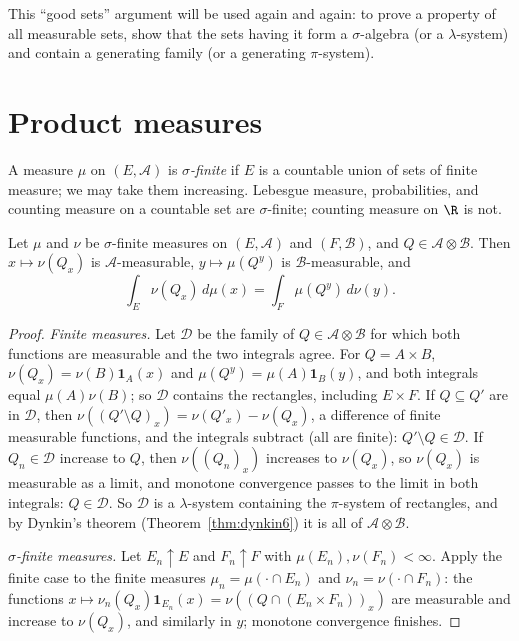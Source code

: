This ``good sets'' argument will be used again and again: to prove a property of all measurable sets, show that the sets having it form a
$\sigma$-algebra (or a $\lambda$-system) and contain a generating family (or a generating $\pi$-system).

\section{Product measures}

A measure $\mu$ on $(E,\mathcal A)$ is \emph{$\sigma$-finite} if $E$ is a countable union of sets of finite measure; we may take them increasing. Lebesgue measure, probabilities, and
counting measure on a countable set are $\sigma$-finite; counting measure on $\R$ is not.

\begin{lemma}\label{lem:slicemeasurable}
Let $\mu$ and $\nu$ be $\sigma$-finite measures on $(E,\mathcal A)$ and $(F,\mathcal B)$, and $Q\in\mathcal A\otimes\mathcal B$. Then $x\mapsto\nu(Q_x)$ is $\mathcal A$-measurable, $y\mapsto\mu(Q^y)$ is $\mathcal B$-measurable, and
\[\int_E\nu(Q_x)\,d\mu(x)=\int_F\mu(Q^y)\,d\nu(y).\]
\end{lemma}
\begin{proof}
\emph{Finite measures.} Let $\mathcal D$ be the family of $Q\in\mathcal A\otimes\mathcal B$ for which both functions are measurable and the two integrals agree. For $Q=A\times B$, $\nu(Q_x)=\nu(B)\mathbf 1_A(x)$
and $\mu(Q^y)=\mu(A)\mathbf 1_B(y)$, and both integrals equal $\mu(A)\nu(B)$; so $\mathcal D$ contains the rectangles, including $E\times F$. If $Q\subseteq Q'$ are in $\mathcal D$, then $\nu((Q'\setminus Q)_x)=\nu(Q'_x)-\nu(Q_x)$,
a difference of finite measurable functions, and the integrals subtract (all are finite): $Q'\setminus Q\in\mathcal D$. If $Q_n\in\mathcal D$ increase to $Q$, then $\nu((Q_n)_x)$ increases to $\nu(Q_x)$, so $\nu(Q_x)$ is
measurable as a limit, and monotone convergence passes to the limit in both integrals: $Q\in\mathcal D$. So $\mathcal D$ is a $\lambda$-system containing the $\pi$-system of rectangles, and by
Dynkin's theorem (Theorem~\ref{thm:dynkin6}) it is all of $\mathcal A\otimes\mathcal B$.

\emph{$\sigma$-finite measures.} Let $E_n\uparrow E$ and $F_n\uparrow F$ with $\mu(E_n),\nu(F_n)<\infty$. Apply the finite case to the finite measures $\mu_n=\mu(\cdot\cap E_n)$ and $\nu_n=\nu(\cdot\cap F_n)$: the
functions $x\mapsto\nu_n(Q_x)\mathbf 1_{E_n}(x)=\nu((Q\cap(E_n\times F_n))_x)$ are measurable and increase to $\nu(Q_x)$, and similarly in $y$; monotone convergence finishes.
\end{proof}

